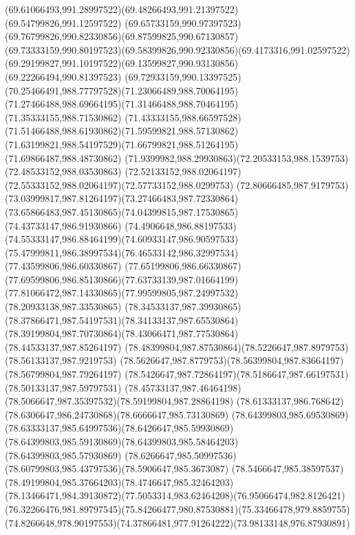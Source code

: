 {{		\curveto(69.61066493,991.28997522)(69.48266493,991.21397522)(69.54799826,991.12597522)
		\curveto(69.65733159,990.97397523)(69.76799826,990.82330856)(69.87599825,990.67130857)
		\curveto(69.73333159,990.80197523)(69.58399826,990.92330856)(69.4173316,991.02597522)
		\curveto(69.29199827,991.10197522)(69.13599827,990.93130856)(69.22266494,990.81397523)
		\curveto(69.72933159,990.13397525)(70.25466491,988.77797528)(71.23066489,988.70064195)
		\curveto(71.27466488,988.69664195)(71.31466488,988.70464195)(71.35333155,988.71530862)
		\curveto(71.43333155,988.66597528)(71.51466488,988.61930862)(71.59599821,988.57130862)
		\curveto(71.63199821,988.54197529)(71.66799821,988.51264195)(71.69866487,988.48730862)
		\curveto(71.9399982,988.29930863)(72.20533153,988.1539753)(72.48533152,988.03530863)
		\curveto(72.52133152,988.02064197)(72.55333152,988.02064197)(72.57733152,988.0299753)
		\curveto(72.80666485,987.9179753)(73.03999817,987.81264197)(73.27466483,987.72330864)
		\curveto(73.65866483,987.45130865)(74.04399815,987.17530865)(74.43733147,986.91930866)
		\curveto(74.4906648,986.88197533)(74.55333147,986.88464199)(74.60933147,986.90597533)
		\curveto(75.47999811,986.38997534)(76.46533142,986.32997534)(77.43599806,986.60330867)
		\curveto(77.65199806,986.66330867)(77.69599806,986.85130866)(77.63733139,987.01664199)
		\curveto(77.81066472,987.14330865)(77.99599805,987.24997532)(78.20933138,987.33530865)
		\curveto(78.34533137,987.39930865)(78.37866471,987.54197531)(78.34133137,987.65530864)
		\curveto(78.39199804,987.70730864)(78.43066471,987.77530864)(78.44533137,987.85264197)
		\curveto(78.48399804,987.87530864)(78.5226647,987.8979753)(78.56133137,987.9219753)
		\curveto(78.5626647,987.8779753)(78.56399804,987.83664197)(78.56799804,987.79264197)
		\curveto(78.5426647,987.72864197)(78.5186647,987.66197531)(78.50133137,987.59797531)
		\curveto(78.45733137,987.46464198)(78.5066647,987.35397532)(78.59199804,987.28864198)
		\curveto(78.61333137,986.768642)(78.6306647,986.24730868)(78.6666647,985.73130869)
		\curveto(78.64399803,985.69530869)(78.63333137,985.64997536)(78.6426647,985.59930869)
		\curveto(78.64399803,985.59130869)(78.64399803,985.58464203)(78.64399803,985.57930869)
		\curveto(78.6266647,985.50997536)(78.60799803,985.43797536)(78.5906647,985.3673087)
		\curveto(78.5466647,985.38597537)(78.49199804,985.37664203)(78.4746647,985.32464203)
		\curveto(78.13466471,984.39130872)(77.5053314,983.62464208)(76.95066474,982.8126421)
		\curveto(76.32266476,981.89797545)(75.84266477,980.87530881)(75.33466478,979.8859755)
		\curveto(74.8266648,978.90197553)(74.37866481,977.91264222)(73.98133148,976.87930891)
}}
